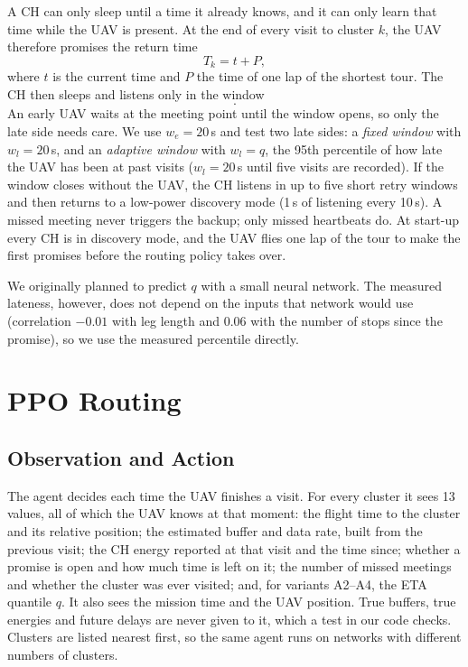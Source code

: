 \documentclass[conference]{IEEEtran}
\begin{document}
A CH can only sleep until a time it already knows, and it can only learn that time while the
UAV is present. At the end of every visit to cluster $k$, the UAV therefore promises the return
time
\begin{equation}
T_k = t + P, \label{eq:promise}
\end{equation}
where $t$ is the current time and $P$ the time of one lap of the shortest tour. The CH then
sleeps and listens only in the window
\begin{equation}
[\,T_k - w_e,\; T_k + w_l\,]. \label{eq:window}
\end{equation}
An early UAV waits at the meeting point until the window opens, so only the late side needs
care. We use $w_e = 20$\,s and test two late sides: a \emph{fixed window} with $w_l = 20$\,s, and
an \emph{adaptive window} with $w_l = q$, the 95th percentile of how late the UAV has been at past
visits ($w_l = 20$\,s until five visits are recorded). If the window closes without the UAV, the
CH listens in up to five short retry windows and then returns to a low-power discovery mode
(1\,s of listening every 10\,s). A missed meeting never triggers the backup; only missed
heartbeats do. At start-up every CH is in discovery mode, and the UAV flies one lap of the tour
to make the first promises before the routing policy takes over.

We originally planned to predict $q$ with a small neural network. The measured lateness,
however, does not depend on the inputs that network would use (correlation $-0.01$ with leg
length and $0.06$ with the number of stops since the promise), so we use the measured
percentile directly.

\section{PPO Routing}\label{sec:method}

\subsection{Observation and Action}

The agent decides each time the UAV finishes a visit. For every cluster it sees 13 values, all
of which the UAV knows at that moment: the flight time to the cluster and its relative position;
the estimated buffer and data rate, built from the previous visit; the CH energy reported at
that visit and the time since; whether a promise is open and how much time is left on it; the
number of missed meetings and whether the cluster was ever visited; and, for variants A2--A4,
the ETA quantile $q$. It also sees the mission time and the UAV position. True buffers, true
energies and future delays are never given to it, which a test in our code checks. Clusters are
listed nearest first, so the same agent runs on networks with different numbers of clusters.
\end{document}
